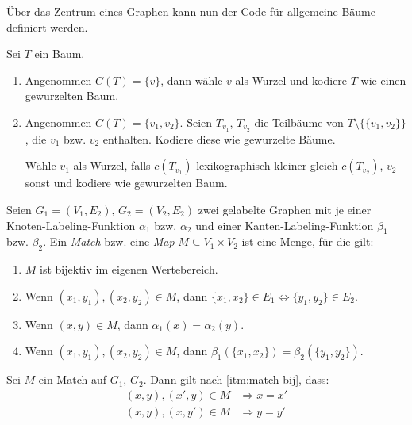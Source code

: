 \begin{definition}
    Über das Zentrum eines Graphen kann nun der Code für allgemeine Bäume definiert werden.

    Sei $ T $ ein Baum.
    \begin{enumerate}
        \item Angenommen $ C(T) = \{ v \} $, dann wähle $ v $ als Wurzel und kodiere $ T $ wie einen gewurzelten Baum.
        \item Angenommen $ C(T) = \{ v_1, v_2 \} $.
        Seien $ T_{v_1} $, $ T_{v_2} $ die Teilbäume von $ T \setminus \{\{ v_1, v_2 \}\}$, die $ v_1 $ bzw. $ v_2 $ enthalten.
        Kodiere diese wie gewurzelte Bäume.

        Wähle $ v_1 $ als Wurzel, falls $ c(T_{v_1}) $ lexikographisch kleiner gleich $ c(T_{v_2}) $, $ v_2 $ sonst und kodiere wie gewurzelten Baum.
    \end{enumerate}
\end{definition}

\begin{definition}
    Seien $ G_1 = (V_1, E_2) $, $ G_2 = (V_2, E_2) $ zwei gelabelte Graphen mit je einer Knoten-Labeling-Funktion $ \alpha_1 $ bzw. $ \alpha_2 $ und einer Kanten-Labeling-Funktion $ \beta_1 $ bzw. $ \beta_2 $.
    Ein \textit{Match} bzw. eine \textit{Map} $ M \subseteq V_1 \times V_2 $ ist eine Menge, für die gilt:
    \begin{enumerate}
        \item \label{itm:match-bij}
        $ M $ ist bijektiv im eigenen Wertebereich.
        \item Wenn $ (x_1, y_1), (x_2, y_2) \in M $, dann $ \{ x_1, x_2 \} \in E_1 \Leftrightarrow \{ y_1, y_2 \} \in E_2 $.
        \item Wenn $ (x, y) \in M $, dann $ \alpha_1(x) = \alpha_2(y) $.
        \item Wenn $ (x_1, y_1), (x_2, y_2) \in M $, dann $ \beta_1(\{ x_1, x_2 \}) = \beta_2(\{ y_1, y_2 \}) $.
    \end{enumerate}
\end{definition}

\begin{proposition}
    Sei $ M $ ein Match auf $ G_1 $, $ G_2 $.
    Dann gilt nach \ref{itm:match-bij}, dass:
    \begin{align*}
        (x, y), (x', y) \in M & \Rightarrow x = x' \\
        (x, y), (x, y') \in M & \Rightarrow y = y'
    \end{align*}
\end{proposition}

